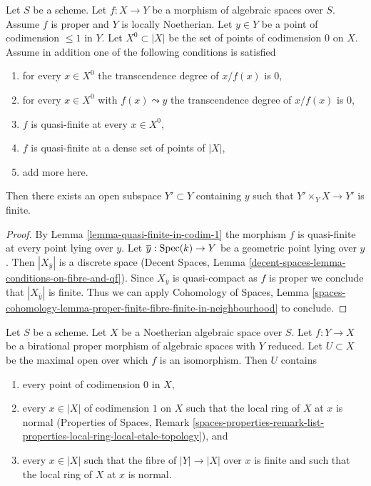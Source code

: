 \begin{lemma}
\label{lemma-finite-in-codim-1}
Let $S$ be a scheme. Let $f : X \to Y$ be a morphism of algebraic spaces
over $S$. Assume $f$ is proper and $Y$ is locally Noetherian.
Let $y \in Y$ be a point of codimension $\leq 1$ in $Y$.
Let $X^0 \subset |X|$ be the set of points of codimension $0$ on $X$.
Assume in addition one of the
following conditions is satisfied
\begin{enumerate}
\item for every $x \in X^0$ the transcendence degree of $x/f(x)$ is $0$,
\item for every $x \in X^0$ with $f(x) \leadsto y$ the transcendence degree
of $x/f(x)$ is $0$,
\item $f$ is quasi-finite at every $x \in X^0$,
\item $f$ is quasi-finite at a dense set of points of $|X|$,
\item add more here.
\end{enumerate}
Then there exists an open subspace $Y' \subset Y$ containing $y$ such that
$Y' \times_Y X \to Y'$ is finite.
\end{lemma}

\begin{proof}
By Lemma \ref{lemma-quasi-finite-in-codim-1} the morphism $f$ is
quasi-finite at every point lying over $y$. Let $\overline{y} : \mathop{\mathrm{Spec}}(k) \to Y$
be a geometric point lying over $y$. Then $|X_{\overline{y}}|$ is a
discrete space (Decent Spaces, Lemma
\ref{decent-spaces-lemma-conditions-on-fibre-and-qf}).
Since $X_{\overline{y}}$ is quasi-compact as $f$ is proper we conclude
that $|X_{\overline{y}}|$ is finite.
Thus we can apply Cohomology of Spaces, Lemma
\ref{spaces-cohomology-lemma-proper-finite-fibre-finite-in-neighbourhood}
to conclude.
\end{proof}

\begin{lemma}
\label{lemma-modification-normal-iso-over-codimension-1}
Let $S$ be a scheme. Let $X$ be a Noetherian algebraic space over $S$.
Let $f : Y \to X$ be a birational proper morphism of algebraic spaces
with $Y$ reduced.
Let $U \subset X$ be the maximal open over which $f$ is an isomorphism.
Then $U$ contains
\begin{enumerate}
\item every point of codimension $0$ in $X$,
\item every $x \in |X|$ of codimension $1$ on $X$ such that the local ring of
$X$ at $x$ is normal (Properties of Spaces, Remark
\ref{spaces-properties-remark-list-properties-local-ring-local-etale-topology}),
and
\item every $x \in |X|$ such that the fibre of $|Y| \to |X|$ over $x$ is
finite and such that the local ring of $X$ at $x$ is normal.
\end{enumerate}
\end{lemma}

